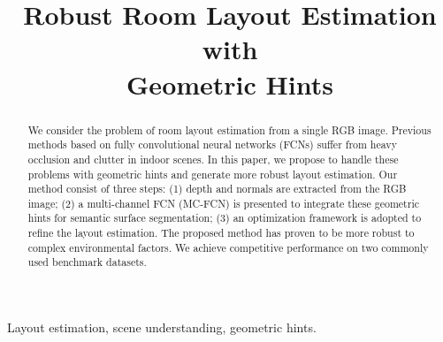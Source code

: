 \documentclass{article}
\title{Robust Room Layout Estimation with\\
	Geometric Hints}
\begin{document}
%
\maketitle
%
\begin{abstract}
We consider the problem of room layout estimation from a single RGB image. Previous methods based on fully convolutional neural networks (FCNs) suffer from heavy occlusion and clutter in indoor scenes. In this paper, we propose to handle these problems with geometric hints and generate more robust layout estimation. Our method consist of three steps: (1) depth and normals are extracted from the RGB image; (2) a multi-channel FCN (MC-FCN) is presented to integrate these geometric hints for semantic surface segmentation; (3) an optimization framework is adopted to refine the layout estimation. The proposed method has proven to be more robust to complex environmental factors. We achieve competitive performance on two commonly used benchmark datasets. 
	
\end{abstract}
%
\begin{keywords}
Layout estimation, scene understanding, geometric hints.
\end{keywords}
%




\end{document}
